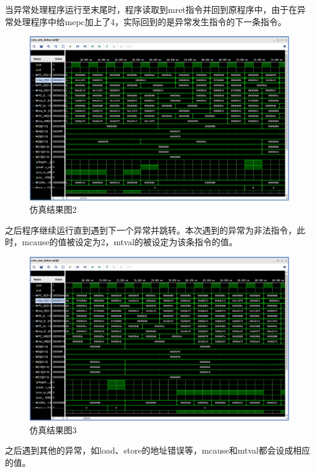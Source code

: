 当异常处理程序运行至末尾时，程序读取到mret指令并回到原程序中，由于在异常处理程序中给mepc加上了4，实际回到的是异常发生指令的下一条指令。
\begin{figure}[H] %
	\centering %
	\includegraphics[width=1.0\textwidth]{figs/2.png} %
	\caption{仿真结果图2} %
	\label{Fig.12} %
\end{figure}
之后程序继续运行直到遇到下一个异常并跳转。本次遇到的异常为非法指令，此时，mcause的值被设定为2，mtval的被设定为该条指令的值。
\begin{figure}[H] %
	\centering %
	\includegraphics[width=1.0\textwidth]{figs/3.png} %
	\caption{仿真结果图3} %
	\label{Fig.13} %
\end{figure}
之后遇到其他的异常，如load、store的地址错误等，mcause和mtval都会设成相应的值。

